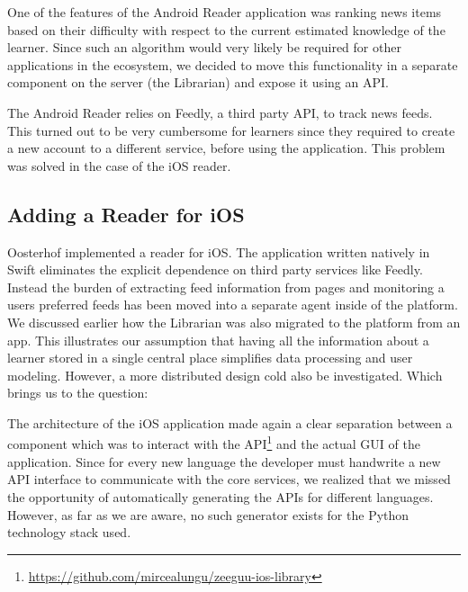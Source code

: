 
One of the features of the Android Reader application was ranking news items based on their difficulty with respect to the current estimated knowledge of the learner. Since such an algorithm would very likely be required for other applications in the ecosystem, we decided to move this functionality in a separate component on the server (the Librarian) and expose it using an API. 

The Android Reader relies on Feedly, a third party API, to track news feeds. This turned out to be very cumbersome for learners since they required to create a new account to a different service, before using the application. This problem was solved in the case of the iOS reader.

\subsection {Adding a Reader for iOS}


Oosterhof \cite{Oost16reading} implemented a reader for iOS. The application written natively in Swift eliminates the explicit dependence on third party services like Feedly. Instead the burden of extracting feed information from pages and monitoring a users preferred feeds has been moved into a separate agent inside of the platform. We discussed earlier how the Librarian was also migrated to the platform from an app. This illustrates our assumption that having all the information about a learner stored in a single central place simplifies data processing and user modeling. However, a more distributed design cold also be investigated. Which brings us to the question: 



The architecture of the iOS application made again a clear separation between a component which was to interact with the API\footnote{\url{https://github.com/mircealungu/zeeguu-ios-library}} and the actual GUI of the application. Since for every new language the developer must handwrite a new API interface to  communicate with the core services, we realized that we missed the opportunity of automatically generating the APIs for different languages. However, as far as we are aware, no such generator exists for the Python technology stack used. 

